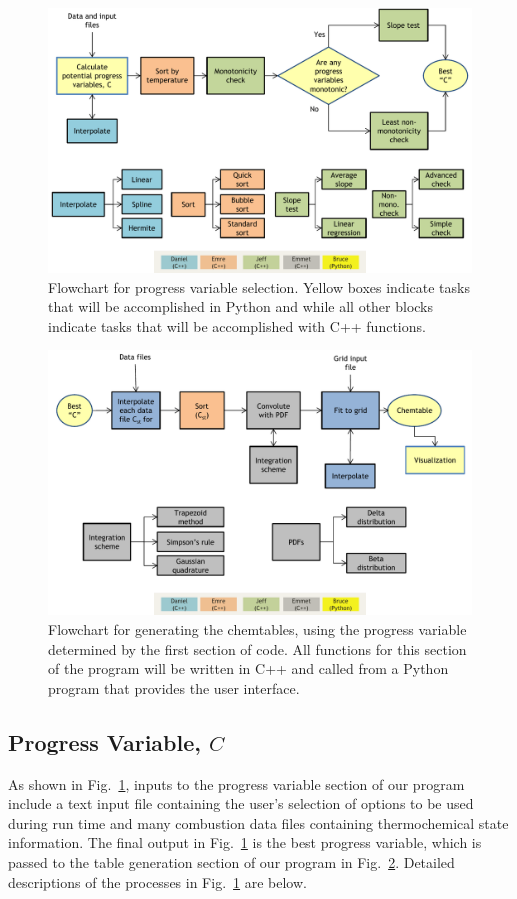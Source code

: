 \documentclass[11pt]{article}
\begin{document}
\begin{figure} [h]
\centering
\includegraphics[width=\textwidth]{diagram_1_shortened_v3}
\caption{\label{fig:flow1} Flowchart for progress variable selection. Yellow boxes indicate tasks that will be accomplished in Python and while all other blocks indicate tasks that will be accomplished with C++ functions.}
\end{figure}

\begin{figure} [h]
\centering
\includegraphics[width=\textwidth]{diagram_2_shortened_v3}
\caption{\label{fig:flow2} Flowchart for generating the chemtables, using the progress variable  determined by the first section of code. All functions for this section of the program will be written in C++ and called from a Python program that provides the user interface.}
\end{figure}

\subsection{Progress Variable, $C$}
As shown in Fig.~\ref{fig:flow1}, inputs to the progress variable
section of our program include a text input file containing the user’s
selection of options to be used during run time and many combustion
data files containing thermochemical state information. The final
output in Fig.~\ref{fig:flow1} is the best progress variable, which is
passed to the table generation section of our program in
Fig.~\ref{fig:flow2}. Detailed descriptions of the processes in
Fig.~\ref{fig:flow1} are below.
\end{document}
